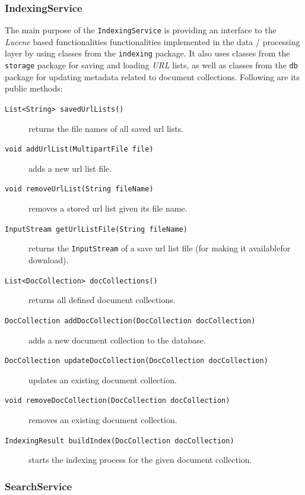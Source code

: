 \documentclass[a4paper]{usiinfbachelorproject}
\begin{document}
\subsubsection{\textbf{IndexingService}}

The main purpose of the \texttt{IndexingService} is providing an interface to the \emph{Lucene} based functionalities
functionalities implemented in the data / processing layer by using classes from the \texttt{indexing} package. It
also uses classes from the \texttt{storage} package for saving and loading \emph{URL} lists, as well as
classes from the \texttt{db} package for updating metadata related to document collections. Following are its public methods:

    \begin{description}

        \item[\texttt{List<String> savedUrlLists()}] returns the file names of all saved url lists.
        \item[\texttt{void addUrlList(MultipartFile file)}] adds a new url list file.
        \item[\texttt{void removeUrlList(String fileName)}] removes a stored url list given its file name.
        \item[\texttt{InputStream getUrlListFile(String fileName)}] returns the \texttt{InputStream} of a save url list file 
                        (for making it availablefor download).
        \item[\texttt{List<DocCollection> docCollections()}] returns all defined document collections.
        \item[\texttt{DocCollection addDocCollection(DocCollection docCollection)}] adds a new document collection to the database.
        \item[\texttt{DocCollection updateDocCollection(DocCollection docCollection)}] updates an existing document collection.
        \item[\texttt{void removeDocCollection(DocCollection docCollection)}] removes an existing document collection.
        \item[\texttt{IndexingResult buildIndex(DocCollection docCollection)}] starts the indexing process for the given document collection.

    \end{description}

\subsubsection{\textbf{SearchService}}\label{sec:archServiceSearch}
\end{document}
